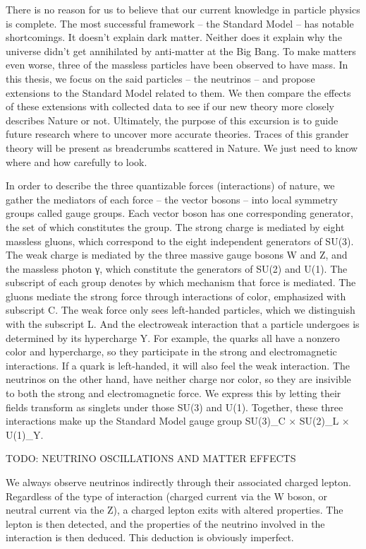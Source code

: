 \documentclass{article}
\begin{document}
There is no reason for us to believe that our current knowledge in particle physics is complete. The most
successful framework – the Standard Model – has notable shortcomings. It doesn't explain dark matter.
Neither does it explain why the universe didn't get annihilated by anti-matter at the Big Bang.
To make matters
even worse, three of the massless particles have been observed to have mass. In this thesis, we focus on
the said particles – the neutrinos – and propose extensions to the Standard Model related to them. We
then compare the effects of these extensions with collected data to see if our new theory more closely
describes Nature or not.
Ultimately, the purpose of this excursion is to guide future research where to uncover more accurate
theories. Traces of this grander theory will be present as breadcrumbs scattered in Nature. We just need
to know where and how carefully to look.

In order to describe the three quantizable forces (interactions) of nature, we gather the mediators of each force – the
vector bosons – into local symmetry groups called gauge groups. Each vector boson has one corresponding generator,
the set of which constitutes the group. The strong charge is mediated by eight massless gluons, which
correspond to the eight independent generators of SU(3). The weak charge is mediated by the three massive gauge
bosons W and Z, and the massless photon γ, which constitute the generators of SU(2) and U(1).
The subscript of each group denotes by which mechanism that force is mediated. The gluons mediate
the strong force through interactions of color, emphasized with subscript C. The weak force only sees
left-handed particles, which we distinguish with the subscript L. And the electroweak interaction that
a particle undergoes is determined by its hypercharge Y. For example, the quarks all have a nonzero
color and hypercharge, so they participate in the strong and electromagnetic interactions. If a quark is
left-handed, it will also feel the weak interaction. The neutrinos on the other hand, have neither charge
nor color, so they are insivible to both the strong and electromagnetic force. We express this by letting
their fields transform as singlets under those SU(3) and U(1).
Together, these three interactions make up the Standard Model gauge group SU(3)_C × SU(2)_L ×
U(1)_Y.

TODO: NEUTRINO OSCILLATIONS AND MATTER EFFECTS 


We always observe neutrinos indirectly through their associated charged lepton. Regardless of the type
of interaction (charged current via the W boson, or neutral current via the Z), a charged lepton exits
with altered properties. The lepton is then detected, and the properties of the neutrino involved in the
interaction is then deduced. This deduction is obviously imperfect.
\end{document}
